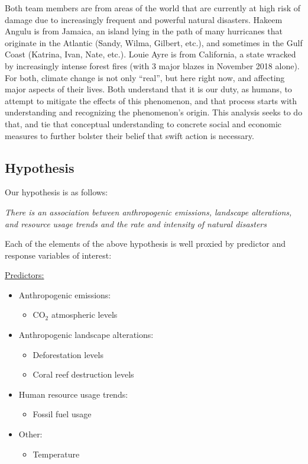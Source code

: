 \documentclass[10pt,]{article}
\begin{document}
Both team members are from areas of the world that are currently at high
risk of damage due to increasingly frequent and powerful natural
disasters. Hakeem Angulu is from Jamaica, an island lying in the path of
many hurricanes that originate in the Atlantic (Sandy, Wilma, Gilbert,
etc.), and sometimes in the Gulf Coast (Katrina, Ivan, Nate, etc.).
Louie Ayre is from California, a state wracked by increasingly intense
forest fires (with 3 major blazes in November 2018 alone). For both,
climate change is not only ``real'', but here right now, and affecting
major aspects of their lives. Both understand that it is our duty, as
humans, to attempt to mitigate the effects of this phenomenon, and that
process starts with understanding and recognizing the phenomenon's
origin. This analysis seeks to do that, and tie that conceptual
understanding to concrete social and economic measures to further
bolster their belief that swift action is necessary.

\newpage

\subsection{Hypothesis}\label{hypothesis}

Our hypothesis is as follows:

\textit{There is an association between anthropogenic emissions, landscape alterations, and resource usage trends and the rate and intensity of natural disasters}

Each of the elements of the above hypothesis is well proxied by
predictor and response variables of interest:

\underline{Predictors:}

\begin{itemize}
  \item Anthropogenic emissions:
  \begin{itemize}
    \item CO$_2$ atmospheric levels
  \end{itemize}
  \item Anthropogenic landscape alterations:
  \begin{itemize}
    \item Deforestation levels
    \item Coral reef destruction levels
  \end{itemize}
  \item Human resource usage trends:
  \begin{itemize}
    \item Fossil fuel usage
  \end{itemize}
  \item Other:
  \begin{itemize}
    \item Temperature
  \end{itemize}
\end{itemize}
\end{document}
